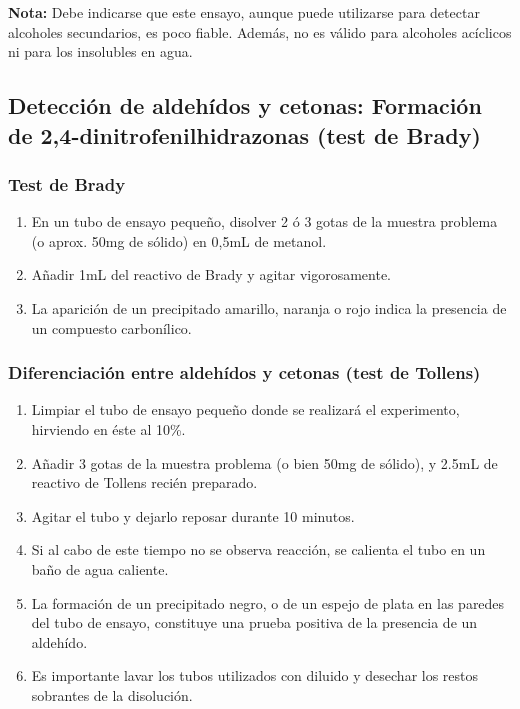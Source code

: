 \textbf{Nota:} Debe indicarse que este ensayo, aunque puede utilizarse para detectar alcoholes secundarios, es poco fiable. Además, no es válido para alcoholes acíclicos ni para los insolubles en agua.




\subsection{Detección de aldehídos y cetonas: Formación de 2,4-dinitrofenilhidrazonas (test de Brady)}

\subsubsection{Test de Brady}
\begin{enumerate}
    \item En un tubo de ensayo pequeño, disolver 2 ó 3 gotas de la muestra problema (o aprox. 50mg de sólido) en 0,5mL de metanol.
\item Añadir 1mL del reactivo de Brady y agitar vigorosamente.
\item La aparición de un precipitado amarillo, naranja o rojo indica la presencia de un compuesto carbonílico.
\end{enumerate}

\subsubsection{Diferenciación entre aldehídos y cetonas (test de Tollens)}
\begin{enumerate}
    \item Limpiar el tubo de ensayo pequeño donde se realizará el experimento, hirviendo en éste  al 10\%.
    \item Añadir 3 gotas de la muestra problema (o bien 50mg de sólido), y 2.5mL de reactivo de Tollens recién preparado.
    \item Agitar el tubo y dejarlo reposar durante 10 minutos.
    \item Si al cabo de este tiempo no se observa reacción, se calienta el tubo en un baño de agua caliente.
    \item La formación de un precipitado negro, o de un espejo de plata en las paredes del tubo de ensayo, constituye una prueba positiva de la presencia de un aldehído.
    \item Es importante lavar los tubos utilizados con  diluido y desechar los restos sobrantes de la disolución.
\end{enumerate}

